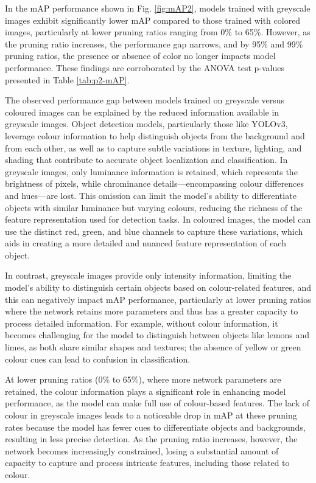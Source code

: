 \documentclass[journal,onecolumn,12pt]{IEEEtran}
\begin{document}
In the mAP performance shown in Fig. \ref{fig:mAP2}, models trained with greyscale images exhibit significantly lower mAP compared to those trained with colored images, particularly at lower pruning ratios ranging from 0\% to 65\%. However, as the pruning ratio increases, the performance gap narrows, and by 95\% and 99\% pruning ratios, the presence or absence of color no longer impacts model performance. These findings are corroborated by the ANOVA test p-values presented in Table \ref{tab:p2-mAP}.

The observed performance gap between models trained on greyscale versus coloured images can be explained by the reduced information available in greyscale images. Object detection models, particularly those like YOLOv3, leverage colour information to help distinguish objects from the background and from each other, as well as to capture subtle variations in texture, lighting, and shading that contribute to accurate object localization and classification. In greyscale images, only luminance information is retained, which represents the brightness of pixels, while chrominance details—encompassing colour differences and hues—are lost. This omission can limit the model’s ability to differentiate objects with similar luminance but varying colours, reducing the richness of the feature representation used for detection tasks. In coloured images, the model can use the distinct red, green, and blue channels to capture these variations, which aids in creating a more detailed and nuanced feature representation of each object.

In contrast, greyscale images provide only intensity information, limiting the model's ability to distinguish certain objects based on colour-related features, and this can negatively impact mAP performance, particularly at lower pruning ratios where the network retains more parameters and thus has a greater capacity to process detailed information. For example, without colour information, it becomes challenging for the model to distinguish between objects like lemons and limes, as both share similar shapes and textures; the absence of yellow or green colour cues can lead to confusion in classification.

At lower pruning ratios (0\% to 65\%), where more network parameters are retained, the colour information plays a significant role in enhancing model performance, as the model can make full use of colour-based features. The lack of colour in greyscale images leads to a noticeable drop in mAP at these pruning rates because the model has fewer cues to differentiate objects and backgrounds, resulting in less precise detection. As the pruning ratio increases, however, the network becomes increasingly constrained, losing a substantial amount of capacity to capture and process intricate features, including those related to colour. 
\end{document}
